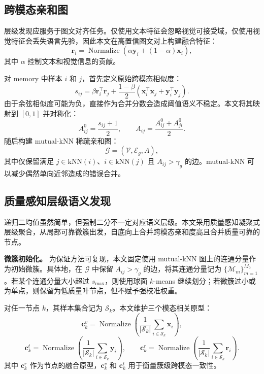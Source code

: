 \subsection{跨模态亲和图}

层级发现应服务于图文对齐任务。仅使用文本特征会忽略视觉可接受域，仅使用视觉特征会丢失语言先验，因此本文在高置信图文对上构建融合特征：
\begin{equation}
    \boldsymbol{r}_i=
    \operatorname{Normalize}\left(
    \alpha\boldsymbol{y}_i+(1-\alpha)\boldsymbol{x}_i
    \right),
\end{equation}
其中 $\alpha$ 控制文本和视觉信息的贡献。

对 memory 中样本 $i$ 和 $j$，首先定义原始跨模态相似度：
\begin{equation}
    s_{ij}
    =
    \beta \boldsymbol{r}_i^{\top}\boldsymbol{r}_j
    +
    \frac{1-\beta}{2}
    \left(
    \boldsymbol{x}_i^{\top}\boldsymbol{x}_j+
    \boldsymbol{y}_i^{\top}\boldsymbol{y}_j
    \right).
\end{equation}
由于余弦相似度可能为负，直接作为合并分数会造成阈值语义不稳定。本文将其映射到 $[0,1]$ 并对称化：
\begin{equation}
    A_{ij}^{0}=\frac{s_{ij}+1}{2},\qquad
    A_{ij}=\frac{A_{ij}^{0}+A_{ji}^{0}}{2}.
\end{equation}
随后构建 mutual-kNN 稀疏亲和图：
\begin{equation}
    \mathcal{G}=(\mathcal{V},\mathcal{E}_g,A),
\end{equation}
其中仅保留满足 $j\in\mathrm{kNN}(i)$、$i\in\mathrm{kNN}(j)$ 且 $A_{ij}>\gamma_g$ 的边。mutual-kNN 可以减少偶然单向近邻造成的错误合并。

\subsection{质量感知层级语义发现}

递归二均值虽然简单，但强制二分不一定对应语义层级。本文采用质量感知凝聚式层级聚合，从局部可靠微簇出发，自底向上合并跨模态亲和度高且合并质量可靠的节点。

\textbf{微簇初始化。}
为保证方法可复现，本文固定使用 mutual-kNN 图上的连通分量作为初始微簇。具体地，在 $\mathcal{G}$ 中保留 $A_{ij}>\gamma_g$ 的边，将其连通分量记为 $\{\mathcal{M}_m\}_{m=1}^{M_0}$。若某个连通分量大小超过 $s_{\max}$，则使用球面 $k$-means 继续划分；若微簇过小或为单点，则保留为低质量叶节点，但不赋予强校准权重。

对任一节点 $k$，其样本集合记为 $\mathcal{S}_k$。本文维护三个模态相关原型：
\begin{equation}
    \boldsymbol{c}_k^v=\operatorname{Normalize}
    \left(\frac{1}{|\mathcal{S}_k|}\sum_{i\in\mathcal{S}_k}\boldsymbol{x}_i\right),
\end{equation}
\begin{equation}
    \boldsymbol{c}_k^t=\operatorname{Normalize}
    \left(\frac{1}{|\mathcal{S}_k|}\sum_{i\in\mathcal{S}_k}\boldsymbol{y}_i\right),
    \qquad
    \boldsymbol{c}_k^r=\operatorname{Normalize}
    \left(\frac{1}{|\mathcal{S}_k|}\sum_{i\in\mathcal{S}_k}\boldsymbol{r}_i\right).
\end{equation}
其中 $\boldsymbol{c}_k^r$ 作为节点的融合原型，$\boldsymbol{c}_k^v$ 和 $\boldsymbol{c}_k^t$ 用于衡量簇级跨模态一致性。

